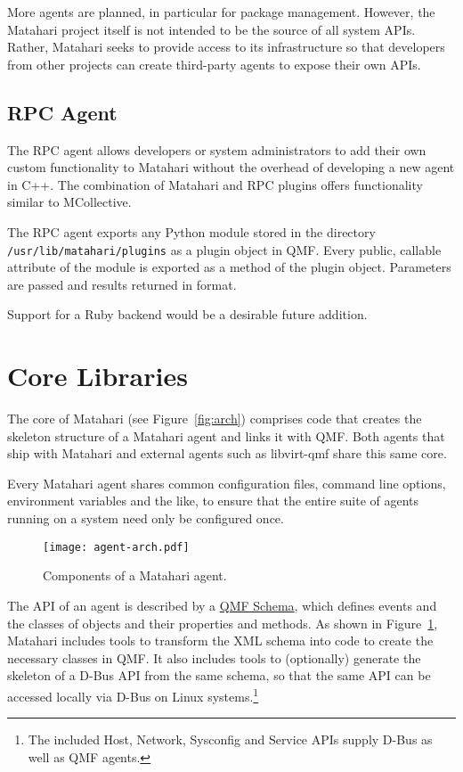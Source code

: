 \documentclass{tufte-handout}
\begin{document}
More agents are planned, in particular for package management.
However, the Matahari project itself is not intended to be the source of all system APIs. Rather, Matahari seeks to provide access to its infrastructure so that developers from other projects can create third-party agents to expose their own APIs.

\subsection{RPC Agent}

The RPC agent allows developers or system administrators to add their own custom functionality to Matahari without the overhead of developing a new agent in C++. The combination of Matahari and RPC plugins offers functionality similar to MCollective.

The RPC agent exports any Python module stored in the directory \Verb|/usr/lib/matahari/plugins| as a plugin object in QMF. Every public, callable attribute of the module is exported as a method of the plugin object. Parameters are passed and results returned in  format.

Support for a Ruby backend would be a desirable future addition.

\section{Core Libraries}

The core of Matahari (see Figure~\ref{fig:arch}) comprises code that creates the skeleton structure of a Matahari agent and links it with QMF. Both agents that ship with Matahari and external agents such as libvirt-qmf share this same core.

Every Matahari agent shares common configuration files, command line options, environment variables and the like, to ensure that the entire suite of agents running on a system need only be configured once.

\begin{figure}[hbt]
\texttt{[image: agent-arch.pdf]}
\caption{Components of a Matahari agent.}
\label{fig:agent-arch}
\end{figure}

The API of an agent is described by a \href{https://cwiki.apache.org/qpid/qpid-management-framework.html#QpidManagementFramework-Schema}{QMF Schema}, which defines events and the classes of objects and their properties and methods. As shown in Figure~\ref{fig:agent-arch}, Matahari includes tools to transform the XML schema into code to create the necessary classes in QMF.
It also includes tools to (optionally) generate the skeleton of a D-Bus API from the same schema, so that the same API can be accessed locally via D-Bus on Linux systems.\footnote{The included Host, Network, Sysconfig and Service APIs supply D-Bus as well as QMF agents.}
\end{document}
